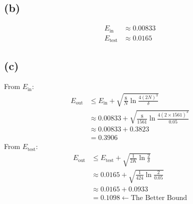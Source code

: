 \documentclass{article}
\begin{document}
		\subsection*{(b)}
			\begin{align*}
				E_{\text{in}} &\approx 0.00833\\
				E_{\text{test}} &\approx 0.0165
			\end{align*}
	
		\subsection*{(c)}
			From $E_{\text{in}}$:
			\begin{align*}
				E_{\text{out}} &\leq E_{\text{in}} + \sqrt{ \frac8N \ln \frac{4(2N)^3}\delta }\\
				&\approx 0.00833 + \sqrt{ \frac8{1561} \ln \frac{4(2\times 1561)^3}{0.05} }\\
				&\approx 0.00833 + 0.3823\\
				&= \boxed{0.3906}
			\end{align*}
			From $E_{\text{test}}$:
			\begin{align*}
				E_{\text{out}} &\leq E_{\text{test}} + \sqrt{ \frac1{2K} \ln \frac{2}\delta }\\
				&\approx 0.0165 + \sqrt{ \frac1{424} \ln \frac{2}{0.05} }\\
				&\approx 0.0165 + 0.0933\\
				&= \boxed{0.1098} \leftarrow \text{The Better Bound}
			\end{align*}
			
\end{document}
